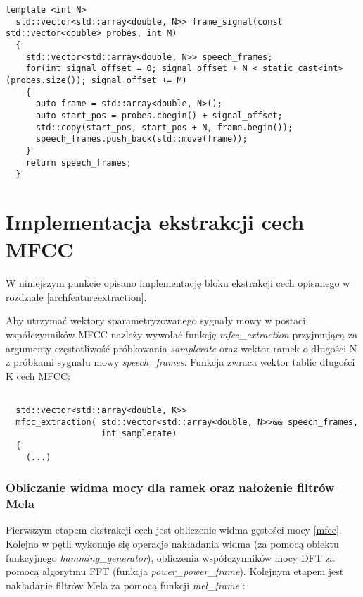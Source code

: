 \begin{lstlisting}[style=lst:cpp, caption=Implementacja funkcji \textit{frame\_signal}\label{lst:frame}]
  template <int N>
  std::vector<std::array<double, N>> frame_signal(const std::vector<double> probes, int M)
  {
    std::vector<std::array<double, N>> speech_frames;
    for(int signal_offset = 0; signal_offset + N < static_cast<int>(probes.size()); signal_offset += M)
    {
      auto frame = std::array<double, N>();
      auto start_pos = probes.cbegin() + signal_offset;
      std::copy(start_pos, start_pos + N, frame.begin());
      speech_frames.push_back(std::move(frame));
    }
    return speech_frames;
  }
\end{lstlisting}

\section{Implementacja ekstrakcji cech MFCC}

W niniejszym punkcie opisano implementację bloku ekstrakcji cech opisanego w rozdziale \ref{archfeatureextraction}.

Aby utrzymać wektory sparametryzowanego sygnały mowy w postaci współczynników MFCC nazleży wywołać funkcję \textit{mfcc\_extraction} przyjmującą za argumenty częstotliwość próbkowania \textit{samplerate} oraz wektor ramek o długości N z próbkami sygnału mowy \textit{speech\_frames}. Funkcja zwraca wektor tablic długości K cech MFCC:

\begin{lstlisting}[style=lst:cpp, caption=Implementacja funkcji mfcc\_extraction\label{lst:mfcc}]

  std::vector<std::array<double, K>>
  mfcc_extraction( std::vector<std::array<double, N>>&& speech_frames,
                   int samplerate)
  {
    (...)
\end{lstlisting}

    \subsubsection{Obliczanie widma mocy dla ramek oraz nałożenie filtrów Mela}

Pierwszym etapem  ekstrakcji cech jest obliczenie widma gęstości mocy {\ref{mfcc}}. Kolejno w pętli wykonuje się operacje nakładania widma (za pomocą obiektu funkcyjnego \textit{hamming\_generator}), obliczenia współczynników mocy DFT za pomocą algorytmu FFT (funkcja \textit{power\_power\_frame}). Kolejnym etapem jest nakładanie filtrów Mela za pomocą funkcji \textit{mel\_frame} : 

